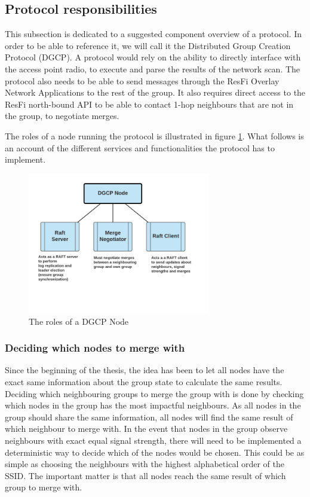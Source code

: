 \subsection{Protocol responsibilities}
This subsection is dedicated to a suggested component overview of a protocol. In order to be able to reference it, we will call it the Distributed Group Creation Protocol (DGCP). 
A protocol would rely on the ability to directly interface with the access point radio, to execute and parse the results of the network scan. The protocol also
needs to be able to send messages through the ResFi Overlay Network Applications to the rest of the group. It also requires direct access to the ResFi north-bound API to be able to contact 1-hop
neighbours that are not in the group, to negotiate merges. 

The roles of a node running the protocol is illustrated in figure \ref{fig:dgcproles}. What follows is an account of the different services and functionalities the protocol
has to implement.  

\begin{figure}
	\centering
	\includegraphics[width=8cm]{Images/dgcpnode.png}
		\caption{The roles of a DGCP Node }%
		\label{fig:dgcproles}%
\end{figure}

\subsubsection{Deciding which nodes to merge with}
Since the beginning of the thesis, the idea has been to let all nodes have the exact same information about the group state to calculate the same results. Deciding
which neighbouring groups to merge the group with is done by checking which nodes in the group has the most impactful neighbours. As all nodes in the group should share
the same information, all nodes will find the same result of which neighbour to merge with.
In the event that nodes in the group observe neighbours with exact equal signal strength, there will need to be implemented a deterministic way to decide which of the nodes would be chosen.
This could be as simple as choosing the neighbours with the highest alphabetical order of the SSID. The important matter is that all nodes reach the same result of which group to merge with. 

